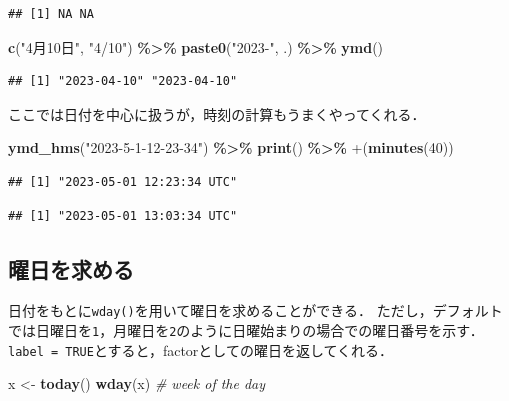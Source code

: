 \documentclass[
]{article}
\newenvironment{Shaded}{\begin{snugshade}}{\end{snugshade}}
\newcommand{\AttributeTok}[1]{\textcolor[rgb]{0.13,0.29,0.53}{#1}}
\newcommand{\CommentTok}[1]{\textcolor[rgb]{0.56,0.35,0.01}{\textit{#1}}}
\newcommand{\DecValTok}[1]{\textcolor[rgb]{0.00,0.00,0.81}{#1}}
\newcommand{\FunctionTok}[1]{\textcolor[rgb]{0.13,0.29,0.53}{\textbf{#1}}}
\newcommand{\NormalTok}[1]{#1}
\newcommand{\OtherTok}[1]{\textcolor[rgb]{0.56,0.35,0.01}{#1}}
\newcommand{\SpecialCharTok}[1]{\textcolor[rgb]{0.81,0.36,0.00}{\textbf{#1}}}
\newcommand{\StringTok}[1]{\textcolor[rgb]{0.31,0.60,0.02}{#1}}
\begin{document}
\begin{verbatim}
## [1] NA NA
\end{verbatim}

\begin{Shaded}
\begin{Highlighting}[]
\FunctionTok{c}\NormalTok{(}\StringTok{"4月10日"}\NormalTok{, }\StringTok{"4/10"}\NormalTok{) }\SpecialCharTok{\%\textgreater{}\%}
  \FunctionTok{paste0}\NormalTok{(}\StringTok{"2023{-}"}\NormalTok{, .) }\SpecialCharTok{\%\textgreater{}\%}
  \FunctionTok{ymd}\NormalTok{()}
\end{Highlighting}
\end{Shaded}

\begin{verbatim}
## [1] "2023-04-10" "2023-04-10"
\end{verbatim}

ここでは日付を中心に扱うが，時刻の計算もうまくやってくれる．

\begin{Shaded}
\begin{Highlighting}[]
\FunctionTok{ymd\_hms}\NormalTok{(}\StringTok{"2023{-}5{-}1{-}12{-}23{-}34"}\NormalTok{) }\SpecialCharTok{\%\textgreater{}\%}
  \FunctionTok{print}\NormalTok{() }\SpecialCharTok{\%\textgreater{}\%}
  \StringTok{\textasciigrave{}}\AttributeTok{+}\StringTok{\textasciigrave{}}\NormalTok{(}\FunctionTok{minutes}\NormalTok{(}\DecValTok{40}\NormalTok{))}
\end{Highlighting}
\end{Shaded}

\begin{verbatim}
## [1] "2023-05-01 12:23:34 UTC"
\end{verbatim}

\begin{verbatim}
## [1] "2023-05-01 13:03:34 UTC"
\end{verbatim}

\hypertarget{ux66dcux65e5ux3092ux6c42ux3081ux308b}{%
\subsection{曜日を求める}\label{ux66dcux65e5ux3092ux6c42ux3081ux308b}}

日付をもとに\texttt{wday()}を用いて曜日を求めることができる．
ただし，デフォルトでは日曜日を\texttt{1}，月曜日を\texttt{2}のように日曜始まりの場合での曜日番号を示す．
\texttt{label\ =\ TRUE}とすると，factorとしての曜日を返してくれる．

\begin{Shaded}
\begin{Highlighting}[]
\NormalTok{x }\OtherTok{\textless{}{-}} \FunctionTok{today}\NormalTok{()}
\FunctionTok{wday}\NormalTok{(x) }\CommentTok{\# week of the day}
\end{Highlighting}
\end{Shaded}
\end{document}
